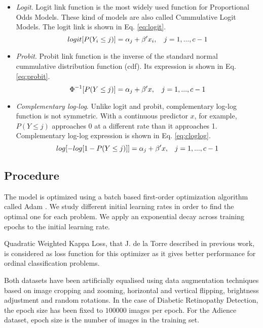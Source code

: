 \documentclass[10pt, a4paper, titlepage, twocolumn]{article}
\begin{document}
	\begin{itemize}
		\item \textit{Logit}. Logit link function is the most widely used function for Proportional Odds Models. These kind of models are also called Cummulative Logit Models. The logit link is shown in Eq. \ref{eq:logit}.
		\begin{equation}
		\small
		logit[P(Y_i \le j)] = \alpha_j + \beta'x_i,\quad j = 1, ..., c - 1
		\label{eq:logit}
		\end{equation}
		\item \textit{Probit}. Probit link function is the inverse of the standard normal cummulative distribution function (cdf). Its expression is shown in Eq. \ref{eq:probit}.	
		\begin{equation}
		\small
		\Phi^{-1}[P(Y \le j)] = \alpha_j + \beta'x,\quad j = 1, ..., c - 1
		\label{eq:probit}
		\end{equation}
		\item \textit{Complementary log-log}. Unlike logit and probit, complementary log-log function is not symmetric. With a continuous predictor $x$, for example, $P(Y \le j)$ approaches 0 at a different rate than it approaches 1. Complementary log-log expression is shown in Eq. \ref{eq:cloglog}.
		\begin{equation}
		\footnotesize
		log[-log[1 - P(Y \le j)]] = \alpha_j + \beta'x,\quad j = 1, ..., c - 1
		\label{eq:cloglog}
		\end{equation}
	\end{itemize}
	
	\subsection{Procedure}
	The model is optimized using a batch based first-order optimization algorithm called Adam \cite{kingma2014adam}. We study different initial learning rates in order to find the optimal one for each problem. We apply an exponential decay across training epochs to the initial learning rate.
	
	Quadratic Weighted Kappa Loss, that J. de la Torre described in previous work, is considered as loss function for this optimizer as it gives better performance for ordinal classification problems.
	
	Both datasets have been artificially equalised using data augmentation techniques \cite{van2001art}\cite{krizhevsky2012imagenet} based on image cropping and zooming, horizontal and vertical flipping, brightness adjustment and random rotations. In the case of Diabetic Retinopathy Detection, the epoch size has been fixed to $100000$ images per epoch. For the Adience dataset, epoch size is the number of images in the training set.
	
\end{document}
